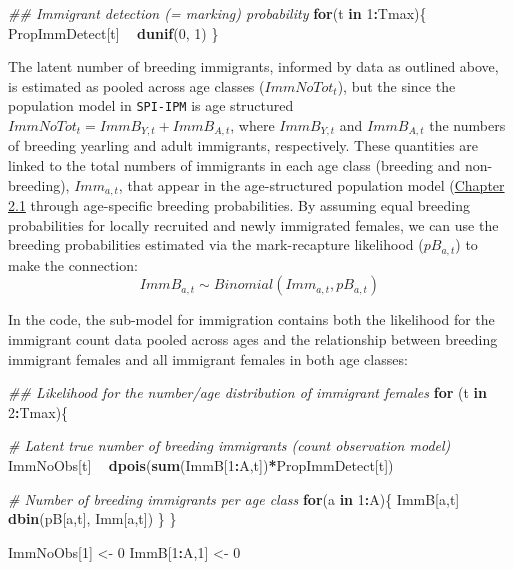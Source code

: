 \documentclass[
]{book}
\newenvironment{Shaded}{\begin{snugshade}}{\end{snugshade}}
\newcommand{\CommentTok}[1]{\textcolor[rgb]{0.56,0.35,0.01}{\textit{#1}}}
\newcommand{\ControlFlowTok}[1]{\textcolor[rgb]{0.13,0.29,0.53}{\textbf{#1}}}
\newcommand{\DecValTok}[1]{\textcolor[rgb]{0.00,0.00,0.81}{#1}}
\newcommand{\KeywordTok}[1]{\textcolor[rgb]{0.13,0.29,0.53}{\textbf{#1}}}
\newcommand{\NormalTok}[1]{#1}
\newcommand{\OperatorTok}[1]{\textcolor[rgb]{0.81,0.36,0.00}{\textbf{#1}}}
\newcommand{\StringTok}[1]{\textcolor[rgb]{0.31,0.60,0.02}{#1}}
\begin{document}
\begin{Shaded}
\begin{Highlighting}[]
\CommentTok{## Immigrant detection (= marking) probability}
\ControlFlowTok{for}\NormalTok{(t }\ControlFlowTok{in} \DecValTok{1}\OperatorTok{:}\NormalTok{Tmax)\{}
\NormalTok{  PropImmDetect[t] }\OperatorTok{~}\StringTok{ }\KeywordTok{dunif}\NormalTok{(}\DecValTok{0}\NormalTok{, }\DecValTok{1}\NormalTok{)}
\NormalTok{\}}
\end{Highlighting}
\end{Shaded}

The latent number of breeding immigrants, informed by data as outlined above, is estimated as pooled across age classes (\(ImmNoTot_t\)), but the since the population model in \texttt{SPI-IPM} is age structured \(ImmNoTot_t = ImmB_{Y,t} +ImmB_{A,t}\), where \(ImmB_{Y,t}\) and \(ImmB_{A,t}\) the numbers of breeding yearling and adult immigrants, respectively. These quantities are linked to the total numbers of immigrants in each age class (breeding and non-breeding), \(Imm_{a,t}\), that appear in the age-structured population model (\protect\hyperlink{ux5cux23ux5cux2520Openux5cux2520populationux5cux2520modelux5cux2520withux5cux25202ux5cux2520ageux5cux2520classes}{Chapter 2.1} through age-specific breeding probabilities.
By assuming equal breeding probabilities for locally recruited and newly immigrated females, we can use the breeding probabilities estimated via the mark-recapture likelihood (\(pB_{a,t}\)) to make the connection:
\begin{equation}
  ImmB_{a,t} \sim Binomial(Imm_{a,t}, pB_{a,t})
\end{equation}

In the code, the sub-model for immigration contains both the likelihood for the immigrant count data pooled across ages and the relationship between breeding immigrant females and all immigrant females in both age classes:

\begin{Shaded}
\begin{Highlighting}[]
\CommentTok{## Likelihood for the number/age distribution of immigrant females}
\ControlFlowTok{for}\NormalTok{ (t }\ControlFlowTok{in} \DecValTok{2}\OperatorTok{:}\NormalTok{Tmax)\{}

  \CommentTok{# Latent true number of breeding immigrants (count observation model)}
\NormalTok{  ImmNoObs[t] }\OperatorTok{~}\StringTok{ }\KeywordTok{dpois}\NormalTok{(}\KeywordTok{sum}\NormalTok{(ImmB[}\DecValTok{1}\OperatorTok{:}\NormalTok{A,t])}\OperatorTok{*}\NormalTok{PropImmDetect[t])}

  \CommentTok{# Number of breeding immigrants per age class}
  \ControlFlowTok{for}\NormalTok{(a }\ControlFlowTok{in} \DecValTok{1}\OperatorTok{:}\NormalTok{A)\{}
\NormalTok{    ImmB[a,t] }\OperatorTok{~}\StringTok{ }\KeywordTok{dbin}\NormalTok{(pB[a,t], Imm[a,t])}
\NormalTok{  \}}
\NormalTok{\}}

\NormalTok{ImmNoObs[}\DecValTok{1}\NormalTok{] <-}\StringTok{ }\DecValTok{0}
\NormalTok{ImmB[}\DecValTok{1}\OperatorTok{:}\NormalTok{A,}\DecValTok{1}\NormalTok{] <-}\StringTok{ }\DecValTok{0}
\end{Highlighting}
\end{Shaded}
\end{document}
